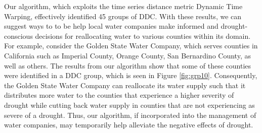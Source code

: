 \documentclass{article}
\begin{document}
Our algorithm, which exploits the time series distance metric Dynamic Time Warping, effectively 
identified 45 groups of DDC. With these results, we can suggest ways to to be help local water companies make informed and drought-conscious decisions for reallocating water to various counties within its domain. For example, consider the Golden State Water Company, which serves counties in California such as Imperial County, Orange County, San Bernardino County, as well as others.\cite{Companies:2019} The results from our algorithm show that some of these counties were identified in a DDC group, which is seen in Figure \ref{fig:grp10}. Consequently, the Golden State Water Company can reallocate its water supply such that it distributes more water to the counties that experience a higher severity of drought while cutting back water supply in counties that are not experiencing as severe of a drought. Thus, our algorithm, if incorporated into the management of water companies, may temporarily help alleviate the negative effects of drought.


\clearpage





\end{document}

